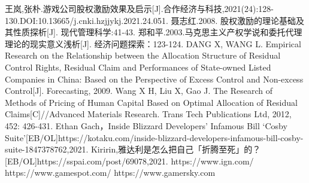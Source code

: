 \documentclass[hyperref]{ctexart}
\begin{document}
\begin{multicols}{2}
	\small
	\begin{thebibliography}{100}%
		王岚,张朴.游戏公司股权激励效果及启示[J].合作经济与科技,2021(24):128-130.DOI:10.13665/j.cnki.hzjjykj.2021.24.051.
		聂志红.2008. 股权激励的理论基础及其性质探析[J]. 现代管理科学:41-43.
		郑和平.2003.马克思主义产权学说和委托代理理论的现实意义浅析[J]. 经济问题探索：123-124.
		DANG X, WANG L. Empirical Research on the Relationship between the Allocation Structure of Residual Control Rights, Residual Claim and Performances of State-owned Listed Companies in China: Based on the Perspective of Excess Control and Non-excess Control[J]. Forecasting, 2009.
		Wang X H, Liu X, Gao J. The Research of Methods of Pricing of Human Capital Based on Optimal Allocation of Residual Claims[C]//Advanced Materials Research. Trans Tech Publications Ltd, 2012, 452: 426-431.
		Ethan Gach，Inside Blizzard Developers’ Infamous Bill ‘Cosby Suite’[EB/OL]https://kotaku.com/inside-blizzard-developers-infamous-bill-cosby-suite-1847378762,2021.
		Kiririn,雅达利是怎么把自己「折腾至死」的？[EB/OL]https://sspai.com/post/69078,2021.
		https://www.ign.com/
		https://www.gamespot.com/
		https://www.gamersky.com
	\end{thebibliography}
	\end{multicols}
	
\end{document}
